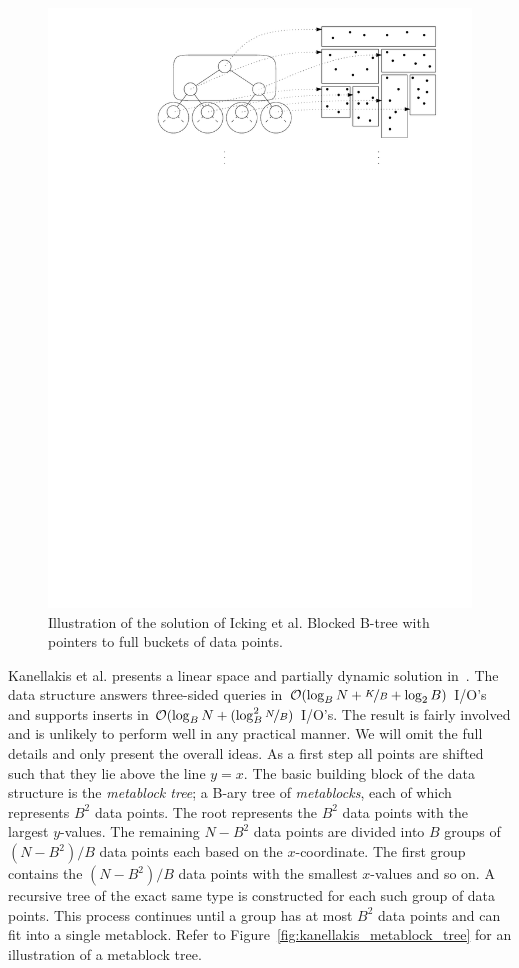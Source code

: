 \documentclass[twoside,11pt,openright]{report}
\begin{document}
\begin{figure}[h]
	\centering
		\includegraphics[width=\textwidth]{../figures/icking_external_pst}
	\caption{Illustration of the solution of Icking et al. Blocked B-tree with pointers to full buckets of data points.}
	\label{fig:icking_external_pst}
\end{figure}

Kanellakis et al. presents a linear space and partially dynamic solution in~\cite{Kanellakis1996589}. The data structure answers three-sided queries in $\mathcal{O}(\log_B N + \nicefrac{K}{B} + \log_2 B)$ I/O's and supports inserts in $\mathcal{O}(\log_B N + (\log^2_B \nicefrac{N}{B})$ I/O's. The result is fairly involved and is unlikely to perform well in any practical manner. We will omit the full details and only present the overall ideas. As a first step all points are shifted such that they lie above the line $y = x$. The basic building block of the data structure is the \textit{metablock tree}; a B-ary tree of \textit{metablocks}, each of which represents $B^2$ data points. The root represents the $B^2$ data points with the largest $y$-values. The remaining $N - B^2$ data points are divided into $B$ groups of $(N - B^2)/B$ data points each based on the $x$-coordinate. The first group contains the $(N - B^2)/B$ data points with the smallest $x$-values and so on. A recursive tree of the exact same type is constructed for each such group of data points. This process continues until a group has at most $B^2$ data points and can fit into a single metablock. Refer to Figure~\ref{fig:kanellakis_metablock_tree} for an illustration of a metablock tree.
\end{document}
